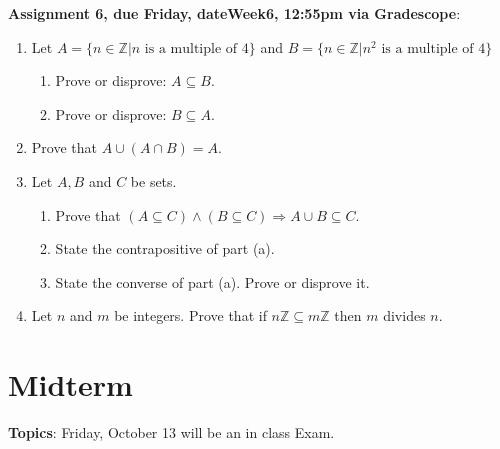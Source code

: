 \documentclass[12pt]{article}
\newcommand{\HWdueTime}{12:55pm }
\newcommand{\Z}{{\mathbb Z}}
\begin{document}
\smallskip
\noindent \textbf{Assignment 6, due Friday, \csname dateWeek6\endcsname, \HWdueTime via Gradescope}:
\begin{enumerate}
\item Let $A = \{ n \in \Z | n \text{ is a multiple of } 4\}$ and $B = \{ n \in \Z | n^2 \text{ is a multiple of } 4\}$ 
 \begin{enumerate}
 \item Prove or disprove: $A \subseteq B$. 
 \item Prove or disprove: $B \subseteq A$. 
 \end{enumerate}

\item Prove that $A \cup (A \cap B) = A.$
\item Let $A,B$ and $C$ be sets. 
 \begin{enumerate}
 \item Prove that $(A \subseteq C) \wedge (B \subseteq C) \Rightarrow A \cup B \subseteq C$.
 \item State the contrapositive of part (a).
 \item State the converse of part (a). Prove or disprove it.
 \end{enumerate}
\item Let $n$ and $m$ be integers. Prove that if $n\Z \subseteq m\Z$ then $m$ divides $n$.
\end{enumerate}


\newpage
\section[ (October 13) Midterm]{Midterm}

\textbf{Topics}: Friday, October 13 will be an in class Exam.
\\
\end{document}
